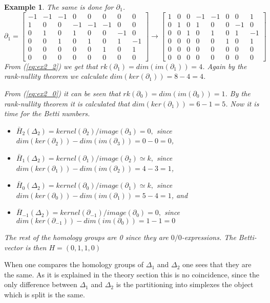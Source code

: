 \documentclass[11pt,a4paper,twoside]{report}
\newtheorem{myex}[mythm]{Example}
\begin{document}
\begin{myex}
The same is done for $\partial_1$.
\begin{equation}\label{eq:ex2_2}
\partial_1=
\begin{bmatrix}
-1 & -1 & -1 & 0 & 0 & 0 & 0 & 0 \\
1 & 0 & 0 & -1 & -1 & -1 & 0 & 0 \\
0 & 1 & 0 & 1 & 0 & 0 & -1 & 0 \\
0 & 0 & 1 & 0 & 1 & 0 & 1 & -1 \\
0 & 0 & 0 & 0 & 0 & 1 & 0 & 1 \\
0 & 0 & 0 & 0 & 0 & 0 & 0 & 0 
\end{bmatrix}
\to
\begin{bmatrix}
1 & 0 & 0 & -1 & -1 & 0 & 0 & 1 \\
0 & 1 & 0 & 1 & 0 & 0 & -1 & 0 \\
0 & 0 & 1 & 0 & 1 & 0 & 1 & -1 \\
0 & 0 & 0 & 0 & 0 & 1 & 0 & 1 \\
0 & 0 & 0 & 0 & 0 & 0 & 0 & 0 \\
0 & 0 & 0 & 0 & 0 & 0 & 0 & 0 
\end{bmatrix}
\end{equation}
From (\ref{eq:ex2_2}) we get that $rk(\partial_1)=dim(im(\partial_1))=4$. Again by the rank-nullity theorem we calculate $dim(ker(\partial_1))=8-4=4$.

From (\ref{eq:ex2_0}) it can be seen that $rk(\partial_0)=dim(im(\partial_0))=1$. By the rank-nullity theorem it is calculated that $dim(ker(\partial_1))=6-1=5$. Now it is time for the Betti numbers.
\begin{itemize}
\item $\bar{H}_2(\Delta_2)=kernel(\partial_2)/image(\partial_{3})=0,$
since $dim(ker(\partial_2))-dim(im(\partial_{3}))=0-0=0$,
\item$\bar{H}_1(\Delta_2)=kernel(\partial_1)/image(\partial_{2})\simeq k,$ since $dim(ker(\partial_1))-dim(im(\partial_{2}))=4-3=1$,
\item$\bar{H}_0(\Delta_2)=kernel(\partial_0)/image(\partial_{1})\simeq k,$
since $dim(ker(\partial_0))-dim(im(\partial_{1}))=5-4=1$, and 
\item$\bar{H}_{-1}(\Delta_2)=kernel(\partial_{-1})/image(\partial_{0})=0,$
since $dim(ker(\partial_{-1}))-dim(im(\partial_{0}))=1-1=0$
\end{itemize}
The rest of the homology groups are 0 since they are $0/0$-expressions.
The Betti-vector is then $H=(0,1,1,0)$
\end{myex}
When one compares the homology groups of $\Delta_1$ and $\Delta_2$ one sees that they are the same. As it is explained in the theory section this is no coincidence, since the only difference between $\Delta_1$ and $\Delta_2$ is the partitioning into simplexes the object which is split is the same.
\end{document}
